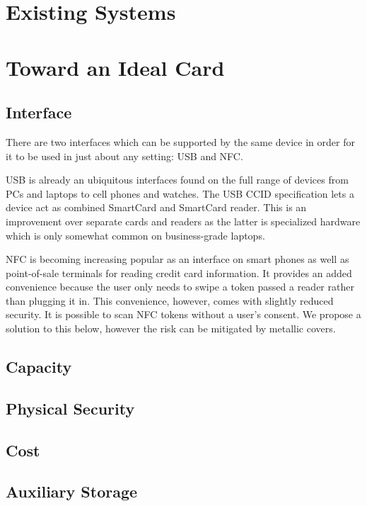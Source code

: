 \documentclass[11pt, twocolumn]{article}
\begin{document}
\section{Existing Systems}
\label{sec:exisitng}

\section{Toward an Ideal Card}
\label{sec:ideal}

\subsection{Interface}

There are two interfaces which can be supported by the same device in order for
it to be used in just about any setting: USB and NFC.

USB is already an ubiquitous interfaces found on the full range of devices from
PCs and laptops to cell phones and watches. The USB CCID specification lets a
device act as combined SmartCard and SmartCard reader. This is an improvement
over separate cards and readers as the latter is specialized hardware which is
only somewhat common on business-grade laptops.

NFC is becoming increasing popular as an interface on smart phones as well as
point-of-sale terminals for reading credit card information. It provides an
added convenience because the user only needs to swipe a token passed a reader
rather than plugging it in. This convenience, however, comes with slightly
reduced security. It is possible to scan NFC tokens without a user's consent. We
propose a solution to this below, however the risk can be mitigated by metallic
covers.

\subsection{Capacity}

\subsection{Physical Security}

\subsection{Cost}

\subsection{Auxiliary Storage}
\end{document}
